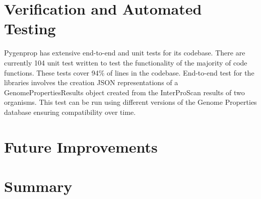 \section{Verification and Automated Testing}

Pygenprop has extensive end-to-end and unit tests for its codebase. There are currently 104 unit test written to test the functionality of the majority of code functions. These tests cover 94\% of lines in the codebase. End-to-end test for the libraries involves the creation JSON representations of a GenomePropertiesResults object created from the InterProScan results of two organisms. This test can be run using different versions of the Genome Properties database ensuring compatibility over time.

\section{Future Improvements}



\section{Summary}
